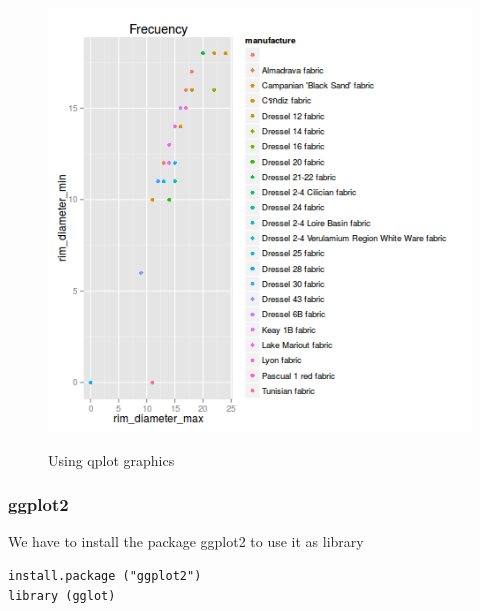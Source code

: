 \documentclass[10pt,a4paper]{article}
\begin{document}
\begin{figure}[hdp]
\centering
\includegraphics[scale=0.30]{qplotminmax.png}
\label{qplot}
\caption{Using qplot graphics}
\end{figure}


\subsubsection{ggplot2}

We have to install the package ggplot2 to use it as library

\begin{verbatim}
install.package ("ggplot2")
library (gglot)
\end{verbatim}

































 
\end{document}
